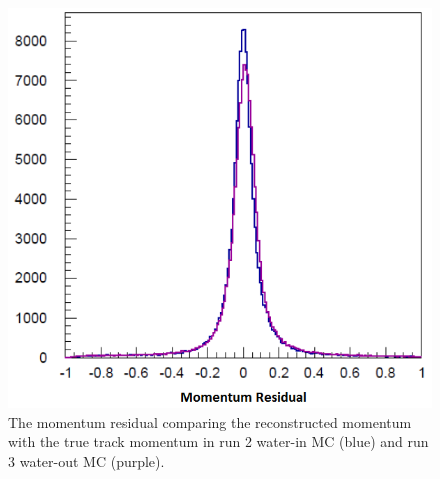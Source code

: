 \begin{figure}
\centering
\includegraphics[width=5.5in]{Figures/momentumresidual.png}
\caption{The momentum residual comparing the reconstructed momentum with the true track momentum in run 2 water-in MC (blue) and run 3 water-out MC (purple).}
\label{fig:momres}
\end{figure}
